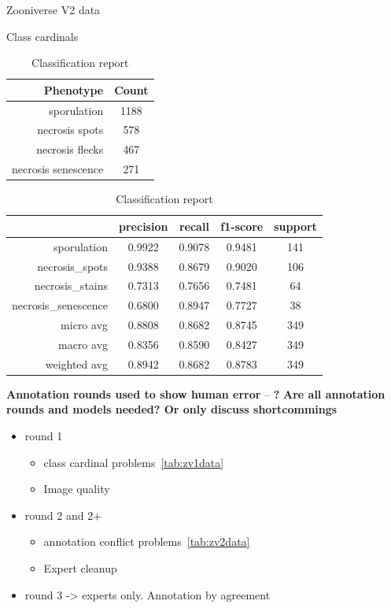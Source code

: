 \documentclass[english]{article}
\begin{document}
\begin{table}[H]
	\caption{Zooniverse V2 data}\label{tab:zv2data}
	\begin{minipage}{0.4\linewidth}
		\centering
		\caption{Class cardinals}\label{tab:zoonv2classcardinals}
		\begin{tabular}{rc}
			\toprule
			Phenotype           & Count \\
			\midrule
			sporulation         & 1188  \\
			necrosis spots       & 578   \\
			necrosis flecks     & 467   \\
			necrosis senescence & 271   \\
			\bottomrule
		\end{tabular}
	\end{minipage}%
	\begin{minipage}{0.4\linewidth}
		\centering
		\caption{Classification report}\label{tab:zv2mcr}
		\begin{tabular}{rcccc}
			\toprule
			{}                   & precision & recall & f1-score & support \\
			\midrule
			sporulation          & 0.9922    & 0.9078 & 0.9481   & 141     \\
			necrosis\_spots       & 0.9388    & 0.8679 & 0.9020   & 106     \\
			necrosis\_stains     & 0.7313    & 0.7656 & 0.7481   & 64      \\
			necrosis\_senescence & 0.6800    & 0.8947 & 0.7727   & 38      \\
			micro avg            & 0.8808    & 0.8682 & 0.8745   & 349     \\
			macro avg            & 0.8356    & 0.8590 & 0.8427   & 349     \\
			weighted avg         & 0.8942    & 0.8682 & 0.8783   & 349     \\
			\bottomrule
		\end{tabular}
	\end{minipage}
\end{table}

\textbf{Annotation rounds used to show human error} -- \textbf{?}
\textbf{Are all annotation rounds and models needed? Or only discuss shortcommings}

\begin{itemize}
	\item round 1
	      \begin{itemize}
		      \item class cardinal problems~\ref*{tab:zv1data}
		      \item Image quality
	      \end{itemize}
	\item round 2 and 2+
	      \begin{itemize}
		      \item annotation conflict problems~\ref*{tab:zv2data}
		      \item Expert cleanup
	      \end{itemize}
	\item round 3 -> experts only. Annotation by agreement
\end{itemize}
\end{document}
